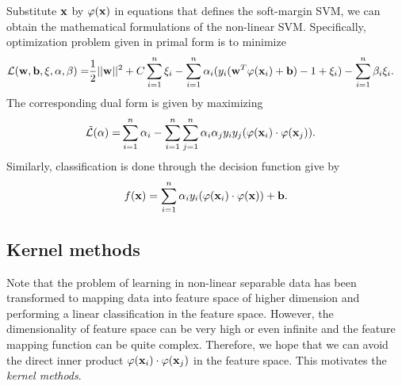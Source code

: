 \documentclass[english]{tktltiki}
\newcommand{\Lcal}{\mathcal{L}}
\newcommand{\xb}{{\bf x}}
\newcommand{\wb}{{\bf w}}
\newcommand{\bb}{{\bf b}}
\newcommand{\xib}{{\bf \xi}}
\newcommand{\valpha}{\mathbf{\alpha}}
\newcommand{\vbeta}{\mathbf{\beta}}
\begin{document}
Substitute $\xb$ by $\varphi(\xb)$ in equations that defines the soft-margin SVM, we can obtain the mathematical formulations of the non-linear SVM. Specifically, optimization problem given in primal form is to minimize
\begin{align}
\Lcal(\wb, \bb, \xib, \valpha, \vbeta) = &\frac{1}{2}||\wb||^2  + C\sum_{i=1}^{n}{\xi_i}- \sum_{i = 1}^n{\alpha_i(y_i(\wb^T \varphi(\xb_i) + \bb)-1 + \xi_i) - \sum_{i=1}^{n}{\beta_i \xi_i}} \text{.}  \label{nonlinear_primal} 
\end{align}
The corresponding dual form is given by maximizing
\begin{align}
\tilde{\Lcal}(\valpha) = &\sum_{i=1}^{n}{\alpha_i} - \sum_{i = 1}^{n}\sum_{j = 1}^{n}{\alpha_i \alpha_j y_i y_j (\varphi(\xb_i) \cdot \varphi(\xb_j))} \text{.} \label{nonlinear_dual} 
\end{align}
Similarly, classification is done through the decision function give by
\begin{align}
f(\xb) = \sum_{i = 1}^{n}{\alpha_i y_i (\varphi(\xb_i) \cdot \varphi(\xb))} + \bb \text{.}
\label{nonlinear_decision}
\end{align}


\subsection{Kernel methods}
\label{kernel_sec}


Note that the problem of learning in non-linear separable data has been transformed to mapping data into feature space of higher dimension and performing a linear classification in the feature space. However, the dimensionality of feature space can be very high or even infinite and the feature mapping function can be quite complex. Therefore, we hope that we can avoid the direct inner product $\varphi(\xb_i) \cdot \varphi(\xb_j)$ in the feature space. This motivates the {\em kernel methods}. 
\end{document}
